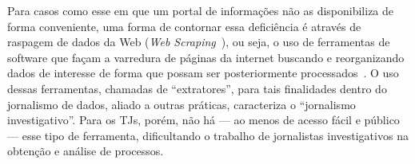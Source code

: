 Para casos como esse em que um portal de informações não as disponibiliza de
forma conveniente, uma forma de contornar essa deficiência é através de
raspagem de dados da Web (\textit{Web
Scraping}~\cite{def:raspagem-de-dados-sbc}), ou seja, o uso de ferramentas de
software que façam a varredura de páginas da internet buscando e reorganizando
dados de interesse de forma que possam ser posteriormente
processados~\cite{def:web-scraping,def:web-scraping-bo-zhao}. O uso dessas
ferramentas, chamadas de ``extratores'', para tais finalidades dentro do
jornalismo de dados, aliado a outras práticas, caracteriza o ``jornalismo
investigativo''. Para os TJs, porém, não há --- ao menos de acesso fácil e
público --- esse tipo de ferramenta, dificultando o trabalho de jornalistas
investigativos na obtenção e análise de processos.
